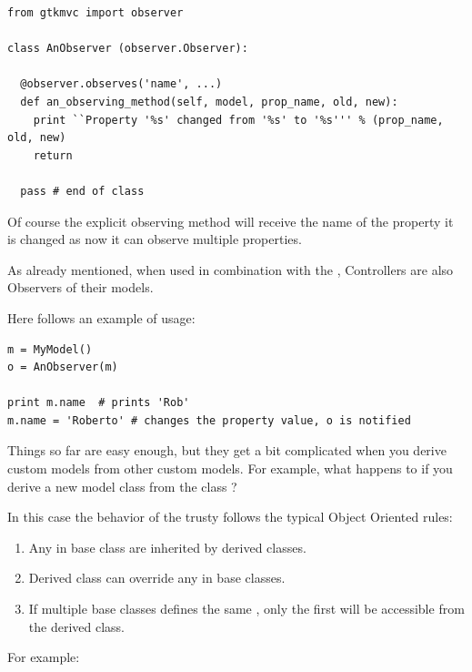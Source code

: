 { \codesize 
\begin{verbatim} 
from gtkmvc import observer

class AnObserver (observer.Observer):

  @observer.observes('name', ...)
  def an_observing_method(self, model, prop_name, old, new):
    print ``Property '%s' changed from '%s' to '%s''' % (prop_name, old, new)
    return

  pass # end of class
\end{verbatim}
}

Of course the explicit observing method will receive the name of the
property it is changed as now it can observe multiple properties. 

As already mentioned, when used in combination with the \mvc,
Controllers are also Observers of their models.

Here follows an example of usage:
{ \codesize 
\begin{verbatim} 
m = MyModel()
o = AnObserver(m)

print m.name  # prints 'Rob'
m.name = 'Roberto' # changes the property value, o is notified
\end{verbatim}
}

Things so far are easy enough, but they get a bit complicated when you
derive custom models from other custom models.  For example, what
happens to \OP if you derive a new model class from the class
?

In this case the behavior of the \OP trusty follows the typical Object
Oriented rules:
\begin{enumerate}
    \item Any \OP in base class are inherited by derived classes.
    \item Derived class can override any \OP in base classes.
    \item If multiple base classes defines the same \OP, only the
      first \OP will be accessible from the derived class.
\end{enumerate}

For example:

